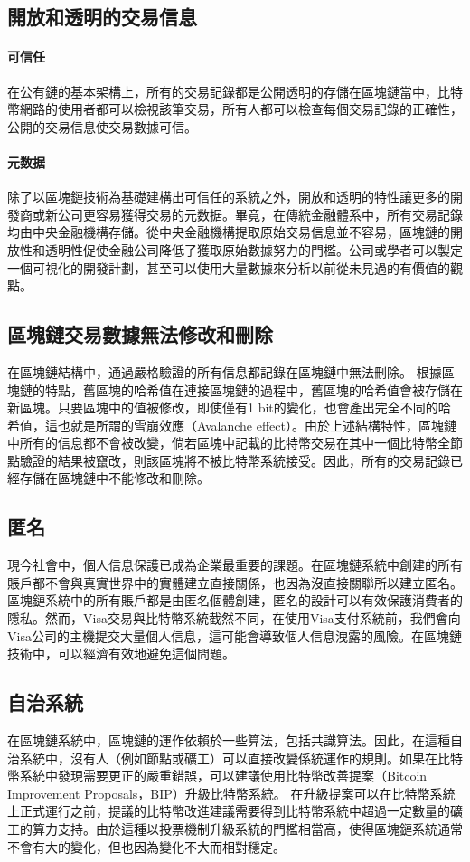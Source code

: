 		\subsection{開放和透明的交易信息}

			\paragraph{可信任}在公有鏈的基本架構上，所有的交易記錄都是公開透明的存儲在區塊鏈當中，比特幣網路的使用者都可以檢視該筆交易，所有人都可以檢查每個交易記錄的正確性，公開的交易信息使交易數據可信。
			\paragraph{元数据}除了以區塊鏈技術為基礎建構出可信任的系統之外，開放和透明的特性讓更多的開發商或新公司更容易獲得交易的元数据。畢竟，在傳統金融體系中，所有交易記錄均由中央金融機構存儲。從中央金融機構提取原始交易信息並不容易，區塊鏈的開放性和透明性促使金融公司降低了獲取原始數據努力的門檻。公司或學者可以製定一個可視化的開發計劃，甚至可以使用大量數據來分析以前從未見過的有價值的觀點。

		\subsection{區塊鏈交易數據無法修改和刪除}在區塊鏈結構中，通過嚴格驗證的所有信息都記錄在區塊鏈中無法刪除。 根據區塊鏈的特點，舊區塊的哈希值在連接區塊鏈的過程中，舊區塊的哈希值會被存儲在新區塊。只要區塊中的值被修改，即使僅有1 bit的變化，也會產出完全不同的哈希值，這也就是所謂的雪崩效應（Avalanche effect）\supercite{Theuseofbentsequencestoachievehigher-orderstrictavalanchecriterioninS-boxdesign}。由於上述結構特性，區塊鏈中所有的信息都不會被改變，倘若區塊中記載的比特幣交易在其中一個比特幣全節點驗證的結果被竄改，則該區塊將不被比特幣系統接受。因此，所有的交易記錄已經存儲在區塊鏈中不能修改和刪除。

		\subsection{匿名}現今社會中，個人信息保護已成為企業最重要的課題。在區塊鏈系統中創建的所有賬戶都不會與真實世界中的實體建立直接關係，也因為沒直接關聯所以建立匿名。區塊鏈系統中的所有賬戶都是由匿名個體創建，匿名的設計可以有效保護消費者的隱私。然而，Visa交易與比特幣系統截然不同，在使用Visa支付系統前，我們會向Visa公司的主機提交大量個人信息，這可能會導致個人信息洩露的風險。在區塊鏈技術中，可以經濟有效地避免這個問題。

		\subsection{自治系統}
		在區塊鏈系統中，區塊鏈的運作依賴於一些算法，包括共識算法。因此，在這種自治系統中，沒有人（例如節點或礦工）可以直接改變係統運作的規則。如果在比特幣系統中發現需要更正的嚴重錯誤，可以建議使用比特幣改善提案（Bitcoin Improvement Proposals，BIP）升級比特幣系統。 在升級提案可以在比特幣系統上正式運行之前，提議的比特幣改進建議需要得到比特幣系統中超過一定數量的礦工的算力支持。由於這種以投票機制升級系統的門檻相當高，使得區塊鏈系統通常不會有大的變化，但也因為變化不大而相對穩定。

